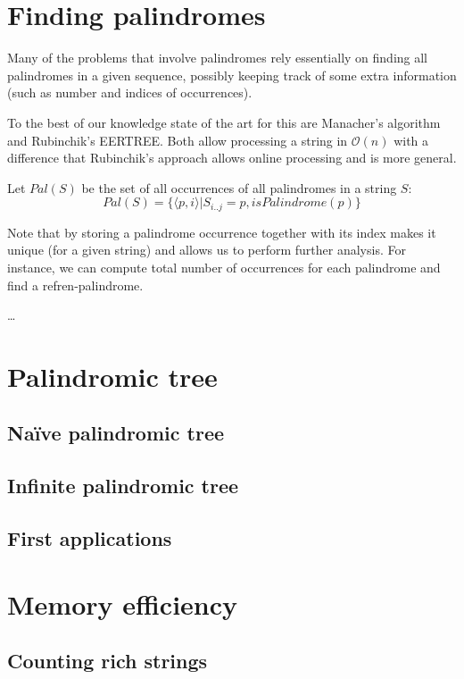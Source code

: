 \section{Finding palindromes}

Many of the problems that involve palindromes rely essentially on finding
all palindromes in a given sequence, possibly keeping track of some extra information
(such as number and indices of occurrences).

To the best of our knowledge state of the art for this are Manacher's algorithm
and Rubinchik's EERTREE. Both allow processing a string in $\mathcal{O}(n)$
with a difference that Rubinchik's approach allows online processing and is more
general.

Let $Pal(S)$ be the set of all occurrences of all
palindromes in a string $S$:
$$
Pal(S) = \{ \langle p, i \rangle | S_{i..j} = p, isPalindrome(p) \}
$$

Note that by storing a palindrome occurrence together with its index
makes it unique (for a given string) and allows us to perform further
analysis. For instance, we can compute total number of occurrences
for each palindrome and find a refren-palindrome.

\ldots

\section{Palindromic tree}

\subsection{Naïve palindromic tree}

\subsection{Infinite palindromic tree}

\subsection{First applications}

\section{Memory efficiency}

\subsection{Counting rich strings}

